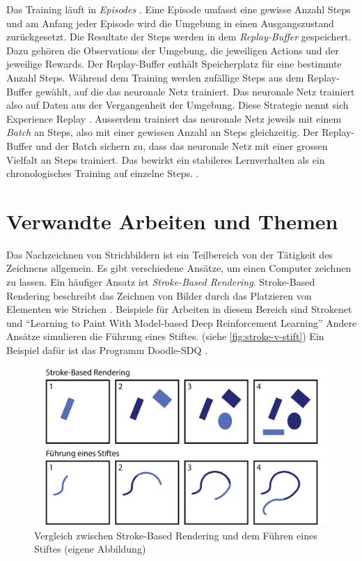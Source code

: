 Das Training läuft in \emph{Episodes} \cite[S. 14]{sutton_reinforcement_2014}.
Eine Episode umfasst eine gewisse Anzahl Steps und am Anfang jeder Episode wird
die Umgebung in einen Ausgangszustand zurückgesetzt. Die Resultate der Steps
werden in dem \emph{Replay-Buffer} gespeichert. Dazu gehören die Observations
der Umgebung, die jeweiligen Actions und der jeweilige Rewards. Der
Replay-Buffer enthält Speicherplatz für eine bestimmte Anzahl Steps. Während dem
Training werden zufällige Steps aus dem Replay-Buffer gewählt, auf die das
neuronale Netz trainiert. Das neuronale Netz trainiert also auf Daten aus der
Vergangenheit der Umgebung. Diese Strategie nennt sich Experience Replay
\cite[S. 5]{mnih_playing_2013}. Ausserdem trainiert das neuronale Netz jeweils
mit einem \emph{Batch} an Steps, also mit einer gewissen Anzahl an Steps
gleichzeitig. Der Replay-Buffer und der Batch sichern zu, dass das neuronale
Netz mit einer grossen Vielfalt an Steps trainiert. Das bewirkt ein stabileres
Lernverhalten als ein chronologisches Training auf einzelne Steps.
\cite{phd_how_2021}.
 
 
\section{Verwandte Arbeiten und Themen}\label{chap:t_ver} Das Nachzeichnen von
Strichbildern ist ein Teilbereich von der Tätigkeit des Zeichnens allgemein. Es
gibt verschiedene Ansätze, um einen Computer zeichnen zu lassen. Ein häufiger
Ansatz ist \emph{Stroke-Based Rendering}. Stroke-Based Rendering beschreibt das
Zeichnen von Bilder durch das Platzieren von Elementen wie Strichen
\cite{aaron_hertzmann_stroke-based_2002}. Beispiele für Arbeiten in diesem Bereich sind
Strokenet \cite{zheng_strokenet_2018} und ``Learning to Paint With Model-based
Deep Reinforcement Learning'' \cite{huang_learning_2019} Andere Ansätze
simulieren die Führung eines Stiftes. (siehe \autoref{fig:stroke-v-stift}) Ein
Beispiel dafür ist das Programm Doodle-SDQ \cite{zhou_learning_2018}.
 
\begin{figure}[!ht]
   \centering
   \includegraphics[width=\textwidth-2cm]{images/theorie/stroke-v-stift.png}
   \caption{Vergleich zwischen Stroke-Based Rendering und dem Führen eines Stiftes (eigene Abbildung)}\label{fig:stroke-v-stift}
\end{figure}
 
